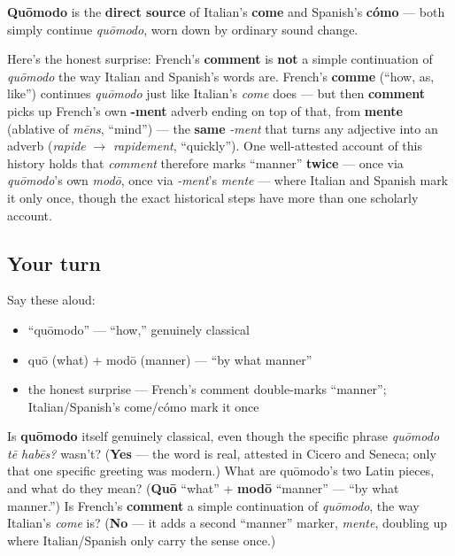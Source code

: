 \begin{cousinweb}
\textbf{Quōmodo} is the \textbf{direct source} of Italian's \textbf{come} and Spanish's \textbf{cómo} — both simply continue \emph{quōmodo}, worn down by ordinary sound change.
\end{cousinweb}

\begin{cousinweb}
Here's the honest surprise: French's \textbf{comment} is \textbf{not} a simple continuation of \emph{quōmodo} the way Italian and Spanish's words are. French's \textbf{comme} (\textquotedblleft{}how, as, like\textquotedblright{}) continues \emph{quōmodo} just like Italian's \emph{come} does — but then \textbf{comment} picks up French's own \textbf{-ment} adverb ending on top of that, from \textbf{mente} (ablative of \emph{mēns}, \textquotedblleft{}mind\textquotedblright{}) — the \textbf{same} \emph{-ment} that turns any adjective into an adverb (\emph{rapide} $\to$ \emph{rapidement}, \textquotedblleft{}quickly\textquotedblright{}). One well-attested account of this history holds that \emph{comment} therefore marks \textquotedblleft{}manner\textquotedblright{} \textbf{twice} — once via \emph{quōmodo}'s own \emph{modō}, once via \emph{-ment}'s \emph{mente} — where Italian and Spanish mark it only once, though the exact historical steps have more than one scholarly account.
\end{cousinweb}

\subsection*{Your turn}
Say these aloud:

\begin{itemize}
\raggedright
  \item \textquotedblleft{}quōmodo\textquotedblright{} — \textquotedblleft{}how,\textquotedblright{} genuinely classical
  \item quō (what) + modō (manner) — \textquotedblleft{}by what manner\textquotedblright{}
  \item the honest surprise — French's comment double-marks \textquotedblleft{}manner\textquotedblright{}; Italian/Spanish's come/cómo mark it once
\end{itemize}

\begin{tcolorbox}[breakable,colback=teal!4,colframe=teal!35!black,title={Before you move on}]
Is \textbf{quōmodo} itself genuinely classical, even though the specific phrase \emph{quōmodo tē habēs?} wasn't? (\textbf{Yes} — the word is real, attested in Cicero and Seneca; only that one specific greeting was modern.) What are quōmodo's two Latin pieces, and what do they mean? (\textbf{Quō} \textquotedblleft{}what\textquotedblright{} + \textbf{modō} \textquotedblleft{}manner\textquotedblright{} — \textquotedblleft{}by what manner.\textquotedblright{}) Is French's \textbf{comment} a simple continuation of \emph{quōmodo}, the way Italian's \emph{come} is? (\textbf{No} — it adds a second \textquotedblleft{}manner\textquotedblright{} marker, \emph{mente}, doubling up where Italian/Spanish only carry the sense once.)
\end{tcolorbox}
